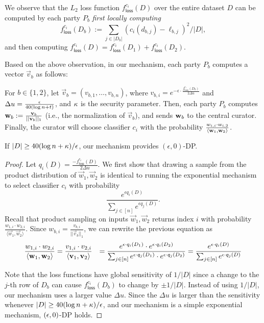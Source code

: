 We observe that the $L_2$ loss function $f^{c_i}_{\mathsf{loss}}(D)$
over the entire dataset $D$ can be computed by each party $P_b$ {\em
first locally computing}
\[
f^{c_i}_{\mathsf{loss}}(D_b) := \sum_{j \in |D_b|}(c_i(d_{b,j}) - \ell_{b,j})^2/|D|,
\]
and then computing 
$f^{c_i}_{\mathsf{loss}}(D) = f^{c_i}_{\mathsf{loss}}(D_1) + f^{c_i}_{\mathsf{loss}}(D_2).$


Based on the above observation, in our mechanism, each party $P_b$
computes a vector $\vec{v}_b$ as follows: 
%
\BI
\item[] For $b \in \{1,2\}$, let $\vec{v}_b = (v_{b,1}, \ldots, v_{b,
n})$, where $v_{b,i} = e^{-\epsilon \cdot \frac{
f^{c_i}_{\mathsf{loss}}(D_b)}{2 \Delta u}}$ and $\Delta u =
\frac{\epsilon}{40(\log n + t)}$, and $\kappa$ is the security parameter. 
\EI
%
Then, each party $P_b$ computes $\mathbf{w}_b :=
\frac{\mathbf{v}_{b}}{||\mathbf{v}_b||_1}$ (i.e., the normalization of
$\vec{v}_b$), and sends $\mathbf{w}_b$ to the central curator. 
%
Finally, the curator will choose classifier $c_i$ with the probability
$\frac{w_{i,i} \cdot w_{i,2}}{\langle \mathbf{w}_1, \mathbf{w}_2 \rangle}$. 

\begin{lemma}
If $|D| \ge 40 (\log n + \kappa)/\epsilon$, our mechanism
provides $(\epsilon, 0)$-DP.  
\end{lemma}

\begin{proof} 
Let $q_i(D) = \frac{-f^{c_i}_{\mathsf{loss}}(D)}{2 \Delta u}$. 
We first show that drawing a sample from the product distribution of
$\vec{w}_1, \vec{w}_2$ is identical to running the exponential mechanism
to select classifier $c_i$ with probability $$\frac{e^{\epsilon q_i(D)}
}{\sum_{j \in [n]} e^{\epsilon q_j(D)}}.$$ 
Recall that product sampling on inputs $\vec{w}_1,
\vec{w}_2$ returns index $i$ with probability $\frac{{w}_{1,i} \cdot
{w}_{2,i}}{\langle \vec{w}_1, \vec{w}_2\rangle}$.  Since
${w}_{b,i} = \frac{{v}_{b,i}}{||\vec{v}_b||_1}$, we can rewrite
the previous equation as
\begin{align*} \frac{{w}_{1,i} \cdot {w}_{2,i}}{\langle \mathbf{w}_1,
\mathbf{w}_2\rangle} & = \frac{{v}_{1,i}
\cdot {v}_{2,i}}{\langle \mathbf{v}_1, \mathbf{v}_2 \rangle} 
    &= \frac{e^{\epsilon \cdot q_i(D_1)}\cdot e^{\epsilon \cdot q_i(D_2)}}
    {\sum_{j \in [n]} e^{\epsilon \cdot q_j(D_1)} \cdot e^{\epsilon \cdot q_j(D_2)}}
    = \frac{e^{\epsilon \cdot q_i(D)}} {\sum_{j \in [n]} e^{\epsilon \cdot q_j(D)}} 
\end{align*} 

Note that the loss functions have global sensitivity of $1/|D|$ since a
change to the $j$-th row of $D_b$ can cause
$f^{c_i}_{\mathsf{loss}}(D_b)$ to change by $\pm 1/|D|$.
%
Instead of using $1/|D|$, our mechanism uses a larger value $\Delta u$.
Since the $\Delta u$ is larger than the sensitivity whenever $|D| \ge 40 (\log{n}+\kappa)/\epsilon$, and our mechanism
is a simple exponential mechanism, $(\epsilon, 0)$-DP holds.  
\end{proof}

